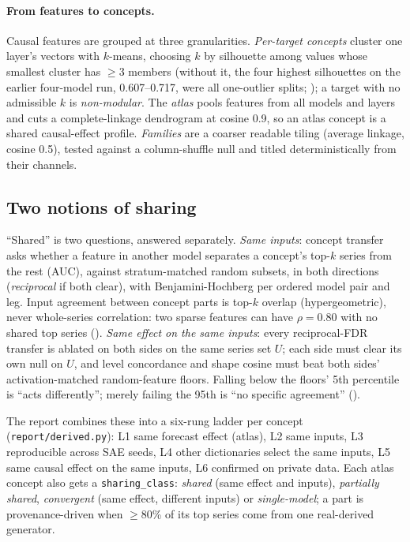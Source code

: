 \paragraph{From features to concepts.} Causal features are grouped at three granularities. \emph{Per-target
concepts} cluster one layer's vectors with $k$-means, choosing $k$ by silhouette
\citep{rousseeuw1987silhouette} among values whose smallest cluster has $\ge$3 members (without it, the four
highest silhouettes on the earlier four-model run, 0.607--0.717, were all one-outlier splits; ); a target with no admissible $k$ is \emph{non-modular}. The
\emph{atlas} pools features from all models and layers and cuts a complete-linkage dendrogram at cosine 0.9,
so an atlas concept is a shared causal-effect profile. \emph{Families} are a coarser readable tiling (average
linkage, cosine 0.5), tested against a column-shuffle null and titled deterministically from their channels.

\subsection{Two notions of sharing}
\label{sec:sharing}

``Shared'' is two questions, answered separately. \emph{Same inputs}: concept transfer asks whether a feature
in another model separates a concept's top-$k$ series from the rest (AUC), against stratum-matched random
subsets, in both directions (\emph{reciprocal} if both clear), with Benjamini-\allowbreak Hochberg
\citep{benjamini1995fdr} per ordered model pair and leg. Input agreement between concept parts is top-$k$
overlap (hypergeometric), never whole-series correlation: two sparse features can have $\rho=0.80$ with no
shared top series (). \emph{Same effect on the same inputs}: every reciprocal-FDR transfer is
ablated on both sides on the same series set $U$; each side must clear its own null on $U$, and level
concordance and shape cosine must beat both sides' activation-matched random-feature floors. Falling below the
floors' 5th percentile is ``acts differently''; merely failing the 95th is ``no specific agreement''
().

The report combines these into a six-rung ladder per concept (\texttt{report/derived.py}): L1 same forecast
effect (atlas), L2 same inputs, L3 reproducible across SAE seeds, L4 other dictionaries select the same
inputs, L5 same causal effect on the same inputs, L6 confirmed on private data. Each atlas concept also gets a
\texttt{sharing\_class}: \emph{shared} (same effect and inputs), \emph{partially shared}, \emph{convergent}
(same effect, different inputs) or \emph{single-model}; a part is provenance-driven when $\ge$80\% of its top
series come from one real-derived generator.

